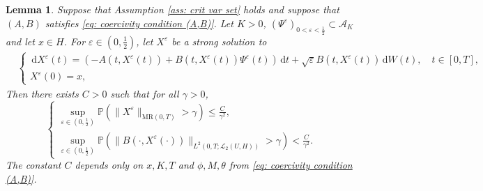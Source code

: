 \documentclass{amsart}
\newcommand{\dd}{\,\mathrm{d}}
\renewcommand{\MR}{\mathrm{MR}}
\newcommand{\UH}{\mathcal{L}_2(U,H)}
\newcommand{\<}{\langle}
\newcommand{\?}{\rangle}
\theoremstyle{plain}
\theoremstyle{remark}
\theoremstyle{plain}
\newtheorem{lemma}[theorem]{Lemma}
\numberwithin{equation}{section}
\renewcommand{\P}{\mathbb{P}}
\newcommand{\eps}{\varepsilon}
\begin{document}
\begin{lemma}\label{lem: X^eps bdd}
Suppose that Assumption \ref{ass: crit var set} holds and suppose that $(A,B)$ satisfies \eqref{eq: coercivity condition (A,B)}.
Let $K>0$, $(\Psi^\eps)_{0< \eps<\frac{1}{2}}\subset \mathcal{A}_K$ and let $x\in H$.
For $\eps\in (0,\frac{1}{2})$, let $X^\eps$ be a strong solution to
  \begin{align}
  &\begin{cases}
    \dd X^\eps(t)=\left(-A(t,X^\eps(t)) +B(t,X^\eps(t))\Psi^\eps(t)\right)\dd t+\sqrt{\eps}B(t,X^\eps(t))\dd W(t), \quad t\in[0,T],\\
    X^\eps(0)=x,
  \end{cases}\label{eq: X^eps SPDE}
  \end{align}
Then there exists $C>0$ such that for all $\gamma>0$,
 \[
 \begin{cases}
 \sup_{\eps\in(0,\frac{1}{2})}\P(\|X^\eps\|_{\MR(0,T)}>\gamma)\leq\frac{C}{\gamma^2},\\
 \sup_{\eps\in(0,\frac{1}{2})}\P(\|B(\cdot,X^\eps(\cdot))\|_{L^2(0,T;\UH)}>\gamma)<\frac{C}{\gamma^2}.
 \end{cases}
 \]
 The constant $C$ depends only on $x,K,T$ and $\phi,M,\theta$ from \eqref{eq: coercivity condition (A,B)}.
\end{lemma}
\end{document}
